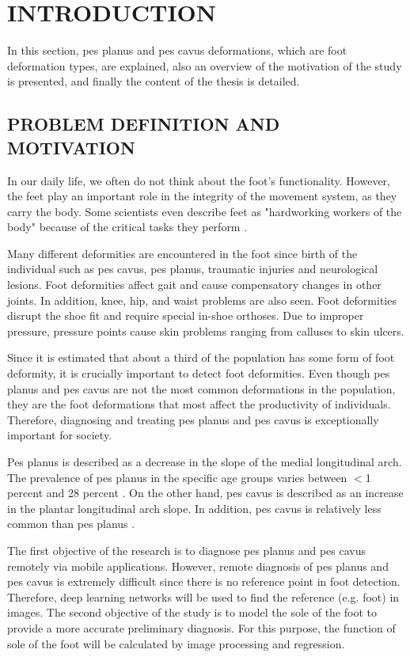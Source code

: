 \chapter{INTRODUCTION}

In this section, pes planus and pes cavus deformations, which are foot deformation types, are explained, also an overview of the motivation of the study is presented, and finally the content of the thesis is detailed.

\section{PROBLEM DEFINITION AND MOTIVATION}

In our daily life, we often do not think about the foot's functionality. However, the feet play an important role in the integrity of the movement system, as they carry the body. Some scientists even describe feet as "hardworking workers of the body" because of the critical tasks they perform \cite{veli2004shoes}.

Many different deformities are encountered in the foot since birth of the individual such as pes cavus, pes planus, traumatic injuries and neurological lesions. Foot deformities affect gait and cause compensatory changes in other joints. In addition, knee, hip, and waist problems are also seen. Foot deformities disrupt the shoe fit and require special in-shoe orthoses. Due to improper pressure, pressure points cause skin problems ranging from calluses to skin ulcers.

Since it is estimated that about a third of the population has some form of foot deformity, it is crucially important to detect foot deformities. Even though pes planus and pes cavus are not the most common deformations in the population, they are the foot deformations that most affect the productivity of individuals. Therefore, diagnosing and treating pes planus and pes cavus is exceptionally important for society.

Pes planus is described as a decrease in the slope of the medial longitudinal arch. The prevalence of pes planus in the specific age groups varies between $<$1 percent and 28 percent \cite{ccilli2009prevalence, pfeiffer2006prevalence, abdel2006flat, chen2009flatfoot}. On the other hand, pes cavus is described as an increase in the plantar longitudinal arch slope. In addition, pes cavus is relatively less common than pes planus \cite{kharbuja2017prevalence}.

The first objective of the research is to diagnose pes planus and pes cavus remotely via mobile applications. However, remote diagnosis of pes planus and pes cavus is extremely difficult since there is no reference point in foot detection. Therefore, deep learning networks will be used to find the reference (e.g. foot) in images. The second objective of the study is to model the sole of the foot to provide a more accurate preliminary diagnosis. For this purpose, the function of sole of the foot will be calculated by image processing and regression.


